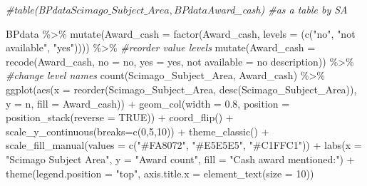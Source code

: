 \documentclass[
]{article}
\newenvironment{Shaded}{\begin{snugshade}}{\end{snugshade}}
\newcommand{\AttributeTok}[1]{\textcolor[rgb]{0.77,0.63,0.00}{#1}}
\newcommand{\CommentTok}[1]{\textcolor[rgb]{0.56,0.35,0.01}{\textit{#1}}}
\newcommand{\ConstantTok}[1]{\textcolor[rgb]{0.00,0.00,0.00}{#1}}
\newcommand{\DecValTok}[1]{\textcolor[rgb]{0.00,0.00,0.81}{#1}}
\newcommand{\FloatTok}[1]{\textcolor[rgb]{0.00,0.00,0.81}{#1}}
\newcommand{\FunctionTok}[1]{\textcolor[rgb]{0.00,0.00,0.00}{#1}}
\newcommand{\NormalTok}[1]{#1}
\newcommand{\OtherTok}[1]{\textcolor[rgb]{0.56,0.35,0.01}{#1}}
\newcommand{\SpecialCharTok}[1]{\textcolor[rgb]{0.00,0.00,0.00}{#1}}
\newcommand{\StringTok}[1]{\textcolor[rgb]{0.31,0.60,0.02}{#1}}
\begin{document}
\begin{Shaded}
\begin{Highlighting}[]
\CommentTok{\#table(BPdata$Scimago\_Subject\_Area, BPdata$Award\_cash) \#as a table by SA}

\NormalTok{BPdata }\SpecialCharTok{\%\textgreater{}\%} 
    \FunctionTok{mutate}\NormalTok{(}\AttributeTok{Award\_cash =} \FunctionTok{factor}\NormalTok{(Award\_cash, }\AttributeTok{levels =}\NormalTok{ (}\FunctionTok{c}\NormalTok{(}\StringTok{"no"}\NormalTok{, }\StringTok{"not available"}\NormalTok{, }\StringTok{"yes"}\NormalTok{)))) }\SpecialCharTok{\%\textgreater{}\%} \CommentTok{\#reorder value levels}
    \FunctionTok{mutate}\NormalTok{(}\AttributeTok{Award\_cash =} \FunctionTok{recode}\NormalTok{(Award\_cash, }\StringTok{\textquotesingle{}no\textquotesingle{}} \OtherTok{=} \StringTok{\textquotesingle{}no\textquotesingle{}}\NormalTok{, }\StringTok{\textquotesingle{}yes\textquotesingle{}} \OtherTok{=} \StringTok{\textquotesingle{}yes\textquotesingle{}}\NormalTok{, }\StringTok{\textquotesingle{}not available\textquotesingle{}} \OtherTok{=} \StringTok{\textquotesingle{}no description\textquotesingle{}}\NormalTok{)) }\SpecialCharTok{\%\textgreater{}\%} \CommentTok{\#change level names}
    \FunctionTok{count}\NormalTok{(Scimago\_Subject\_Area, Award\_cash) }\SpecialCharTok{\%\textgreater{}\%}
    \FunctionTok{ggplot}\NormalTok{(}\FunctionTok{aes}\NormalTok{(}\AttributeTok{x =} \FunctionTok{reorder}\NormalTok{(Scimago\_Subject\_Area, }\FunctionTok{desc}\NormalTok{(Scimago\_Subject\_Area)), }\AttributeTok{y =}\NormalTok{ n, }\AttributeTok{fill =}\NormalTok{ Award\_cash)) }\SpecialCharTok{+} 
    \FunctionTok{geom\_col}\NormalTok{(}\AttributeTok{width =} \FloatTok{0.8}\NormalTok{, }\AttributeTok{position =} \FunctionTok{position\_stack}\NormalTok{(}\AttributeTok{reverse =} \ConstantTok{TRUE}\NormalTok{)) }\SpecialCharTok{+}
    \FunctionTok{coord\_flip}\NormalTok{() }\SpecialCharTok{+}
    \FunctionTok{scale\_y\_continuous}\NormalTok{(}\AttributeTok{breaks=}\FunctionTok{c}\NormalTok{(}\DecValTok{0}\NormalTok{,}\DecValTok{5}\NormalTok{,}\DecValTok{10}\NormalTok{)) }\SpecialCharTok{+}
    \FunctionTok{theme\_classic}\NormalTok{() }\SpecialCharTok{+} 
    \FunctionTok{scale\_fill\_manual}\NormalTok{(}\AttributeTok{values =} \FunctionTok{c}\NormalTok{(}\StringTok{"\#FA8072"}\NormalTok{, }\StringTok{"\#E5E5E5"}\NormalTok{, }\StringTok{"\#C1FFC1"}\NormalTok{)) }\SpecialCharTok{+}
    \FunctionTok{labs}\NormalTok{(}\AttributeTok{x =} \StringTok{"Scimago Subject Area"}\NormalTok{, }\AttributeTok{y =} \StringTok{"Award count"}\NormalTok{, }\AttributeTok{fill =} \StringTok{"Cash award mentioned:"}\NormalTok{) }\SpecialCharTok{+} 
    \FunctionTok{theme}\NormalTok{(}\AttributeTok{legend.position =} \StringTok{"top"}\NormalTok{, }\AttributeTok{axis.title.x =} \FunctionTok{element\_text}\NormalTok{(}\AttributeTok{size =} \DecValTok{10}\NormalTok{))}
\end{Highlighting}
\end{Shaded}
\end{document}
